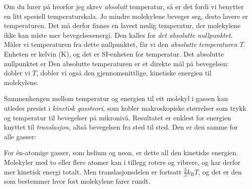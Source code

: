 Om du lurer på hvorfor jeg skrev \emph{absolutt} temperatur, så er det fordi vi benytter en litt spesiell temperaturskala. Jo mindre molekylene beveger seg, desto lavere er temperaturen. Det må derfor finnes en lavest mulig temperatur, der molekylene ikke kan miste mer bevegelsesenergi. Den kalles for \emph{det absolutte nullpunktet}. Måler vi temperaturen fra dette nullpunktet, får vi den \emph{absolutte temperaturen} $T$. Enheten er kelvin (\si{\kelvin}), og det er SI-enheten for temperatur. Det absolutte nullpunktet er
Den absolutte temperaturen er et direkte mål på bevegelsen: dobler vi $T$, dobler vi også den gjennomsnittlige, kinetiske energien til molekylene.

Sammenhengen mellom temperatur og energien til ett molekyl i gassen kan utledes presist i \emph{kinetisk gassteori}, som kobler makroskopiske størrelser som trykk og temperatur til bevegelser på mikronivå. Resultatet er enklest for energien knyttet til \emph{translasjon}, altså bevegelsen fra sted til sted. Den er den samme for alle gasser:

For én-atomige gasser, som helium og neon, er dette all den kinetiske energien. Molekyler med to eller flere atomer kan i tillegg rotere og vibrere, og har derfor mer kinetisk energi totalt. Men translasjonsdelen er fortsatt $\tfrac{3}{2}k_\text{B}T$, og det er den som bestemmer hvor fort molekylene farer rundt.




